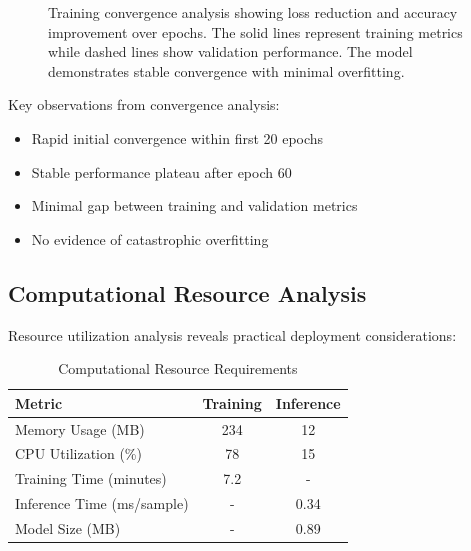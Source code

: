 \documentclass[12pt,a4paper]{article}
\begin{document}
	\begin{figure}[H]
		\centering
		
		\caption{Training convergence analysis showing  loss reduction and  accuracy improvement over epochs. The solid lines represent training metrics while dashed lines show validation performance. The model demonstrates stable convergence with minimal overfitting.}
		\label{fig:convergence}
	\end{figure}
	
	Key observations from convergence analysis:
	\begin{itemize}
		\item Rapid initial convergence within first 20 epochs
		\item Stable performance plateau after epoch 60
		\item Minimal gap between training and validation metrics
		\item No evidence of catastrophic overfitting
	\end{itemize}
	
	\subsection{Computational Resource Analysis}
	
	Resource utilization analysis reveals practical deployment considerations:
	
	\begin{table}[H]
		\centering
		\caption{Computational Resource Requirements}
		\label{tab:resources}
		\begin{tabular}{@{}lcc@{}}
			\toprule
			Metric & Training & Inference \\
			\midrule
			Memory Usage (MB) & 234 & 12 \\
			CPU Utilization (\%) & 78 & 15 \\
			Training Time (minutes) & 7.2 & - \\
			Inference Time (ms/sample) & - & 0.34 \\
			Model Size (MB) & - & 0.89 \\
			\bottomrule
		\end{tabular}
	\end{table}
	
\end{document}
